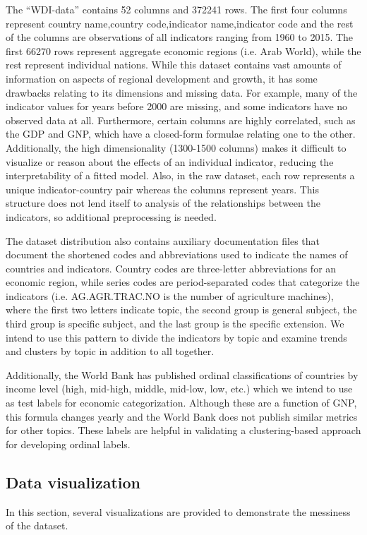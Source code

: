\documentclass[a4paper]{article}
\begin{document}
The ``WDI-data'' contains 52 columns and 372241 rows. The first four columns represent country name,country code,indicator name,indicator code and the rest of the columns are observations of all indicators ranging from 1960 to 2015. The first 66270 rows represent aggregate economic regions (i.e. Arab World), while the rest represent individual nations. While this dataset contains vast amounts of information on aspects of regional development and growth, it has some drawbacks relating to its dimensions and missing data. For example, many of the indicator values for years before 2000 are missing, and some indicators have no observed data at all. Furthermore, certain columns are highly correlated, such as the GDP and GNP, which have a closed-form formulae relating one to the other. Additionally, the high dimensionality (1300-1500 columns) makes it difficult to visualize or reason about the effects of an individual indicator, reducing the interpretability of a fitted model. Also, in the raw dataset, each row represents a unique indicator-country pair whereas the columns represent years. This structure does not lend itself to analysis of the relationships between the indicators, so additional preprocessing is needed.

The dataset distribution also contains auxiliary documentation files that document the shortened codes and abbreviations used to indicate the names of countries and indicators. Country codes are three-letter abbreviations for an economic region, while series codes are period-separated codes that categorize the indicators (i.e. AG.AGR.TRAC.NO is the number of agriculture machines), where the first two letters indicate topic, the second group is general subject, the third group is specific subject, and the last group is the specific extension. We intend to use this pattern to divide the indicators by topic and examine trends and clusters by topic in addition to all together.

Additionally, the World Bank has published ordinal classifications of countries by income level (high, mid-high, middle, mid-low, low, etc.) which we intend to use as test labels for economic categorization. Although these are a function of GNP, this formula changes yearly and the World Bank does not publish similar metrics for other topics. These labels are helpful in validating a clustering-based approach for developing ordinal labels.
\subsection{Data visualization}
In this section, several visualizations are provided to demonstrate the messiness of the dataset. 
\end{document}
